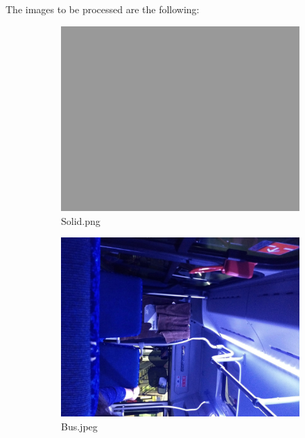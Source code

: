 The images to be processed are the following:
\begin{figure}[!h]
  \centering
  \begin{subfigure}[b]{0.48\textwidth}
    \centering
    \includegraphics[width=\textwidth]{res/Solid.png}
    \caption{Solid.png}
  \end{subfigure}
  \begin{subfigure}[b]{0.48\textwidth}
    \centering
    \includegraphics[width=\textwidth]{res/Bus.jpeg}
    \caption{Bus.jpeg}
  \end{subfigure}
  \begin{subfigure}[b]{0.48\textwidth}
    \centering

\end{subfigure}
\end{figure}
